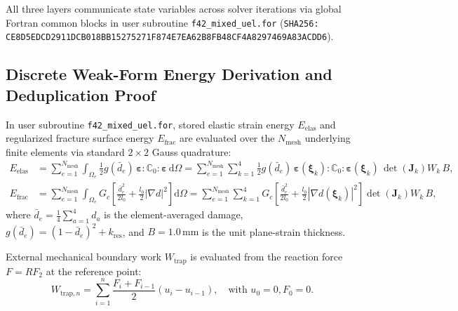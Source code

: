 All three layers communicate state variables across solver iterations via global Fortran common blocks in user subroutine \nolinkurl{f42_mixed_uel.for} (\nolinkurl{SHA256: CE8D5EDCD2911DCB018BB15275271F874E7EA62B8FB48CF4A8297469A83ACDD6}).

\subsection{Discrete Weak-Form Energy Derivation and Deduplication Proof}
\label{sec:uel_energy_derivation}

In user subroutine \nolinkurl{f42_mixed_uel.for}, stored elastic strain energy $E_{\mathrm{elas}}$ and regularized fracture surface energy $E_{\mathrm{frac}}$ are evaluated over the $N_{\mathrm{mesh}}$ underlying finite elements via standard $2\times 2$ Gauss quadrature:
\begin{align}
  E_{\mathrm{elas}} &= \sum_{e=1}^{N_{\mathrm{mesh}}} \int_{\Omega_e} \frac{1}{2} g(\bar{d}_e)\,\boldsymbol{\varepsilon} : \mathbb{C}_0 : \boldsymbol{\varepsilon} \,\mathrm{d}\Omega = \sum_{e=1}^{N_{\mathrm{mesh}}} \sum_{k=1}^{4} \frac{1}{2} g(\bar{d}_e)\,\boldsymbol{\varepsilon}(\boldsymbol{\xi}_k) : \mathbb{C}_0 : \boldsymbol{\varepsilon}(\boldsymbol{\xi}_k) \, \det(\mathbf{J}_k) W_k \, B, \label{eq:elas_weak_energy} \\
  E_{\mathrm{frac}} &= \sum_{e=1}^{N_{\mathrm{mesh}}} \int_{\Omega_e} G_c \left[ \frac{\bar{d}_e^2}{2 l_0} + \frac{l_0}{2} |\nabla d|^2 \right] \mathrm{d}\Omega = \sum_{e=1}^{N_{\mathrm{mesh}}} \sum_{k=1}^{4} G_c \left[ \frac{\bar{d}_e^2}{2 l_0} + \frac{l_0}{2} |\nabla d(\boldsymbol{\xi}_k)|^2 \right] \det(\mathbf{J}_k) W_k \, B, \label{eq:frac_weak_energy}
\end{align}
where $\bar{d}_e = \frac{1}{4}\sum_{a=1}^4 d_a$ is the element-averaged damage, $g(\bar{d}_e) = (1-\bar{d}_e)^2 + k_{\mathrm{res}}$, and $B = 1.0\,\mathrm{mm}$ is the unit plane-strain thickness.

External mechanical boundary work $W_{\mathrm{trap}}$ is evaluated from the reaction force $F = RF_2$ at the reference point:
\begin{equation}
  W_{\mathrm{trap},n} = \sum_{i=1}^{n} \frac{F_i + F_{i-1}}{2}(u_i - u_{i-1}), \quad \text{with } u_0 = 0, F_0 = 0.
\end{equation}

